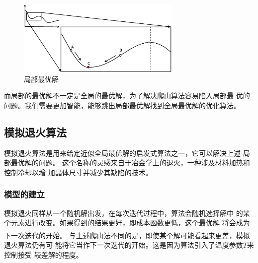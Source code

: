 \documentclass[fontset=fandol,a4paper,zihao=5]{ctexart}
\newcommand{\upcite}[1]{\textsuperscript{\textsuperscript{\cite{#1}}}}
\begin{document}
			\begin{figure}[!htbp]
				\centering
				\includegraphics[width=0.7\textwidth]{pic/local_best.eps}
				\caption{\label{fig:local_best}局部最优解}
			\end{figure}

			而局部的最优解不一定是全局的最优解，为了解决爬山算法容易陷入局部最
            优的问题。我们需要更加智能，能够跳出局部最优解找到全局最优解的优化算法。
		\subsection{模拟退火算法}
			模拟退火算法是用来给定近似全局最优解的启发式算法之一，它可以解决上述
            局部最优解的问题。
			这个名称的灵感来自于冶金学上的退火，一种涉及材料加热和控制冷却以增
            加晶体尺寸并减少其缺陷的技术。
			
			\subsubsection{模型的建立}
			模拟退火同样从一个随机解出发，在每次迭代过程中，算法会随机选择解中
            的某个元素进行改变。如果得到的结果更好，即成本函数更低，这个最优解
            将会成为下一次迭代的开始\upcite{王雪梅1997模拟退火算法与遗传算法的结合}。
			与上述爬山法不同的是，即使某个解可能看起来更差，模拟退火算法仍有可
            能将它当作下一次迭代的开始。这是因为算法引入了温度参数$T$来控制接受
            较差解的程度。
			
\end{document}
